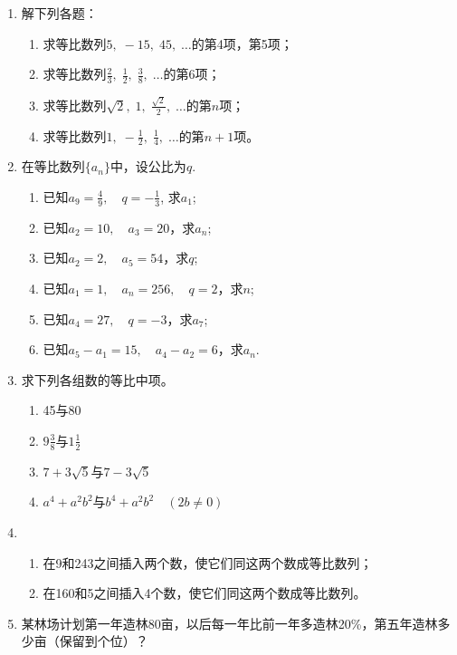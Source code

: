 \begin{ex}
\begin{enumerate}
    \item 解下列各题：
\begin{enumerate}[(1)]
\item 求等比数列$5,\; -15,\; 45,\;\ldots$的第4项，第5项；
\item 求等比数列$\frac{2}{3},\; \frac{1}{2},\; \frac{3}{8},\;\ldots$的第6项；
\item 求等比数列$\sqrt{2},\; 1,\; \frac{\sqrt{2}}{2},\; \ldots$的第$n$项；
\item 求等比数列$1,\; -\frac{1}{2},\; \frac{1}{4},\; \ldots$的第$n+1$项。
\end{enumerate}

\item 在等比数列$\{a_n\}$中，设公比为$q$.
\begin{enumerate}[(1)]
\item 已知$a_9=\frac{4}{9},\quad q=-\frac{1}{3}$, 求$a_1$;
\item 已知$a_2=10,\quad a_3=20$，求$a_n$;
\item 已知$a_2=2,\quad a_5=54$，求$q$;
\item 已知$a_1=1,\quad a_n=256,\quad q=2$，求$n$;
\item 已知$a_4=27,\quad q=-3$，求$a_7$;
\item 已知$a_5-a_1=15,\quad a_4-a_2=6$，求$a_n$.
\end{enumerate}

\item 求下列各组数的等比中项。
\begin{enumerate}[(1)]
\item 45与80
\item $9\frac{3}{8}$与$1\frac{1}{2}$
\item $7+3\sqrt{5}$与$7-3\sqrt{5}$
\item $a^4+a^2b^2$与$b^4+a^2b^2\quad (2b\ne 0)$
\end{enumerate}

\item \begin{enumerate}[(1)]
\item 在9和243之间插入两个数，使它们同这两个数成等比数列；
\item 在160和5之间插入4个数，使它们同这两个数成等比数列。  
\end{enumerate}

\item 某林场计划第一年造林80亩，以后每一年比前一年多造林20\%，第五年造林多少亩（保留到个位）？
\end{enumerate}
\end{ex}

